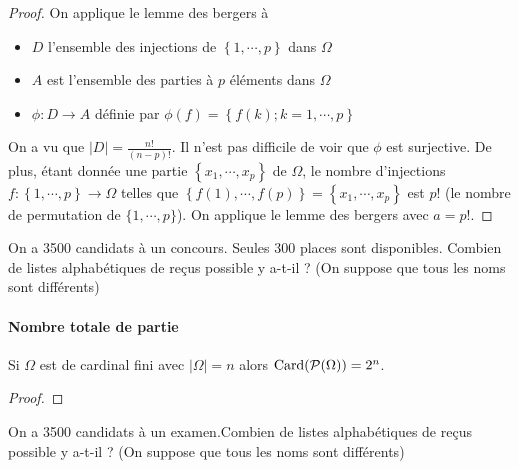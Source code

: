 \begin{proof}
	\sld{\small}	On applique le lemme des bergers à 
	\begin{itemize}
		\item $D$ l'ensemble des injections de $\left\{ 1,\cdots,p \right\}$ dans $\Omega$
		\item $A$ est l'ensemble des parties à $p$ éléments dans $\Omega$
		\item $\phi: D\to A$ définie par $\phi(f) = \left\{ f(k) ;  k= 1,\cdots,p\right\}$
	\end{itemize}
	On a vu que $|D| = \frac{n!}{(n-p)!}$. Il n'est pas difficile de voir que $\phi$ est surjective. De plus, étant donnée une partie $\left\{ x_1,\cdots,x_p \right\}$ de $\Omega$, le nombre d'injections $f:\left\{ 1,\cdots,p \right\}\to \Omega$ telles que $\left\{ f(1),\cdots,f(p) \right\} = \left\{ x_1,\cdots,x_p \right\}$ est $p!$ (le nombre de permutation de $\{1,\cdots,p\}$). 
	On applique le lemme des bergers avec $a=p!$. 
\end{proof}

\begin{exemple}
	On a 3500 candidats à un concours. Seules 300 places sont disponibles. Combien de listes alphabétiques de reçus possible y a-t-il ? (On suppose que tous les noms sont différents)
	\pl{\rep{3cm}}
\end{exemple}

\paragraph{Nombre totale de partie} Si $\Omega$ est de cardinal fini avec $|\Omega|= n$ alors $ \operatorname{Card}(\mathcal{P}(\Omega)) = 2^n$.

\begin{proof}
		\pl{\rep{4cm}} 
\end{proof}
\begin{exemple}
	On a 3500 candidats à un examen.Combien de listes alphabétiques de reçus possible y a-t-il ? (On suppose que tous les noms sont différents)
	\pl{\rep{3cm}}
\end{exemple}

